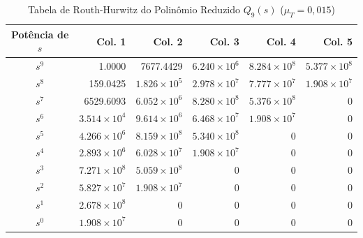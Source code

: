 \begin{table}[htbp]
\centering
\caption{Tabela de Routh-Hurwitz do Polinômio Reduzido $Q_9(s)$ ($\mu_T = 0,015$)}
\begin{tabular}{c|rrrrr}
\hline
Potência de $s$ & Col. 1 & Col. 2 & Col. 3 & Col. 4 & Col. 5 \\
\hline
$s^9$ & 1.0000 & 7677.4429 & $6.240 \times 10^{6}$ & $8.284 \times 10^{8}$ & $5.377 \times 10^{8}$ \\
$s^8$ & 159.0425 & $1.826 \times 10^{5}$ & $2.978 \times 10^{7}$ & $7.777 \times 10^{7}$ & $1.908 \times 10^{7}$ \\
$s^7$ & 6529.6093 & $6.052 \times 10^{6}$ & $8.280 \times 10^{8}$ & $5.376 \times 10^{8}$ & 0 \\
$s^6$ & $3.514 \times 10^{4}$ & $9.614 \times 10^{6}$ & $6.468 \times 10^{7}$ & $1.908 \times 10^{7}$ & 0 \\
$s^5$ & $4.266 \times 10^{6}$ & $8.159 \times 10^{8}$ & $5.340 \times 10^{8}$ & 0 & 0 \\
$s^4$ & $2.893 \times 10^{6}$ & $6.028 \times 10^{7}$ & $1.908 \times 10^{7}$ & 0 & 0 \\
$s^3$ & $7.271 \times 10^{8}$ & $5.059 \times 10^{8}$ & 0 & 0 & 0 \\
$s^2$ & $5.827 \times 10^{7}$ & $1.908 \times 10^{7}$ & 0 & 0 & 0 \\
$s^1$ & $2.678 \times 10^{8}$ & 0 & 0 & 0 & 0 \\
$s^0$ & $1.908 \times 10^{7}$ & 0 & 0 & 0 & 0 \\
\hline
\end{tabular}
\end{table}